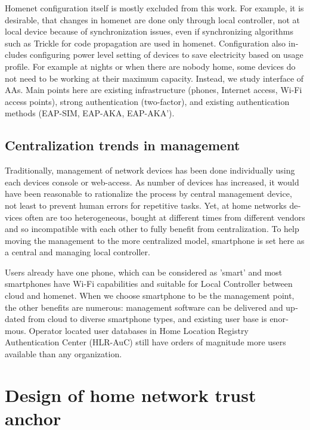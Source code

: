 \documentclass[12pt,a4paper,english]{tutthesis}
\begin{document}
\begin{otherlanguage}{english}
Homenet configuration itself is mostly excluded from this work.
For example, 
it is desirable, that changes in homenet are done only through
local controller, not at local device because of
synchronization issues, even 
if synchronizing algorithms such as Trickle  \cite{rfc6206}
for code propagation are used in homenet.
Configuration also includes configuring power level setting of devices to save electricity
based on usage profile. For example at nights or when there are nobody
home, some devices do not need to be working at their maximum
capacity. Instead, we study interface of AAs.
Main points here are existing infrastructure (phones, Internet access, Wi-Fi
access points), strong authentication (two-factor), and existing
authentication methods (EAP-SIM, EAP-AKA, EAP-AKA').
\section{Centralization trends in management}
\label{sec-3-2}

Traditionally, management of network devices has been done
individually using each devices console or web-access.  As number of
devices has increased, it would have been reasonable to rationalize
the process by central management device, not least to prevent human
errors for repetitive tasks.  Yet, at home networks devices often are
too heterogeneous, bought at different times from different vendors
and so incompatible with each other to fully benefit from
centralization. To help moving the management to the more centralized
model, smartphone is set here as a central and managing local
controller.


Users already have one phone, which can be considered as
'smart' and most smartphones have Wi-Fi capabilities and suitable for 
Local Controller between cloud and homenet.
When we choose smartphone to be the management point, the other benefits are
numerous:  management software can be delivered and
updated from cloud to diverse smartphone types, and existing user
base is enormous.
Operator located user databases in  
Home Location Registry Authentication Center (HLR-AuC) still have orders of
magnitude more users available than any organization. 



\chapter{Design of home network trust anchor}
\label{sec-4}





\end{otherlanguage}
\end{document}
